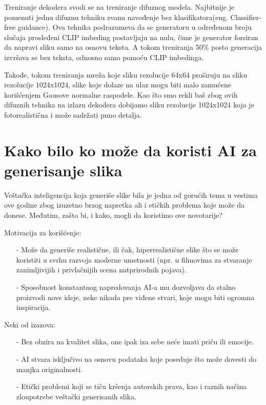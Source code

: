 \documentclass[12pt, letterpaper]{article}
\begin{document}
Treniranje dekodera svodi se na treniranje difuznog modela. Najbitnije je pomenuti jednu difuznu tehniku zvanu navođenje bez klasifikatora(eng. Classifier-free guidance). Ova tehnika podrazumeva da se generatoru u određenom broju slučaja prosleđeni CLIP imbeding postavljaju na nulu, čime je generator forsiran da napravi sliku samo na osnovu teksta. A tokom treniranja 50\% posto generacija izvršava se bez teksta, odnosno samo pomoću CLIP imbedinga.

Takođe, tokom treniranja mreža koje sliku rezolucije 64x64 proširuju na sliku rezolucije 1024x1024, slike koje dolaze na ulaz mogu biti malo zamućene korišćenjem Gausove normalne raspodele. Kao što smo rekli baš zbog ovih difuznih tehnika na izlazu dekodera dobijamo sliku rezolucije 1024x1024 koja je fotorealistična i može sadržati puno detalja.\cite{openai_dali}

\section{Kako bilo ko može da koristi AI za generisanje slika}
Veštačka inteligencija koja generiše slike bila je jedna od gorućih tema u vestima ove godine zbog izuzetno brzog napretka ali i etičkih problema koje može da donese. Međutim, zašto bi, i kako, mogli da koristimo ove novotarije?

Motivacija za korišćenje:
\begin{itemize}
  \item[-] Može da generiše realistične, ili čak, hiperrealistične slike što se može koristiti u svrhu razvoja moderne umetnosti (npr. u filmovima za stvaranje zanimljivijih i privlačnijih scena natprirodnih pojava).
  \item[-] Sposobnost konstantnog napredovanja AI-a mu dozvoljava da stalno proizvodi nove ideje, neke nikada pre viđene stvari, koje mogu biti ogromna inspiracija.
\end{itemize}

Neki od izazova:
\begin{itemize}
    \item[-] Bez obzira na kvalitet slika, one ipak iza sebe neće imati priču ili emocije.
    \item[-] AI stvara isključivo na osnovu podataka koje poseduje što može dovesti do manjka originalnosti.
    \item[-] Etički problemi koji se tiču kršenja autorskih prava, kao i raznih načina zloupotrebe veštački generisanih slika. 
\end{itemize}
\end{document}
